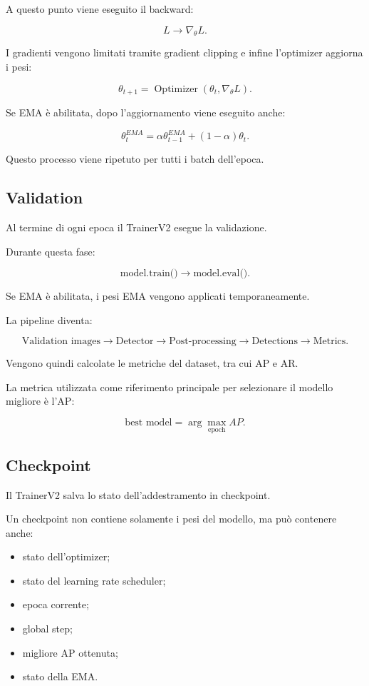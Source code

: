 A questo punto viene eseguito il backward:

\[
L
\rightarrow
\nabla_\theta L.
\]

I gradienti vengono limitati tramite gradient clipping e infine
l'optimizer aggiorna i pesi:

\[
\theta_{t+1}
=
\operatorname{Optimizer}
(\theta_t,\nabla_\theta L).
\]

Se EMA è abilitata, dopo l'aggiornamento viene eseguito anche:

\[
\theta_t^{EMA}
=
\alpha\theta_{t-1}^{EMA}
+
(1-\alpha)\theta_t.
\]

Questo processo viene ripetuto per tutti i batch dell'epoca.

\subsection{Validation}

Al termine di ogni epoca il TrainerV2 esegue la validazione.

Durante questa fase:

\[
\text{model.train()}
\rightarrow
\text{model.eval()}.
\]

Se EMA è abilitata, i pesi EMA vengono applicati temporaneamente.

La pipeline diventa:

\[
\text{Validation images}
\rightarrow
\text{Detector}
\rightarrow
\text{Post-processing}
\rightarrow
\text{Detections}
\rightarrow
\text{Metrics}.
\]

Vengono quindi calcolate le metriche del dataset, tra cui AP e AR.

La metrica utilizzata come riferimento principale per selezionare il modello
migliore è l'AP:

\[
\text{best model}
=
\arg\max_{\text{epoch}} AP.
\]

\subsection{Checkpoint}

Il TrainerV2 salva lo stato dell'addestramento in checkpoint.

Un checkpoint non contiene solamente i pesi del modello, ma può contenere
anche:

\begin{itemize}
    \item stato dell'optimizer;
    \item stato del learning rate scheduler;
    \item epoca corrente;
    \item global step;
    \item migliore AP ottenuta;
    \item stato della EMA.
\end{itemize}

